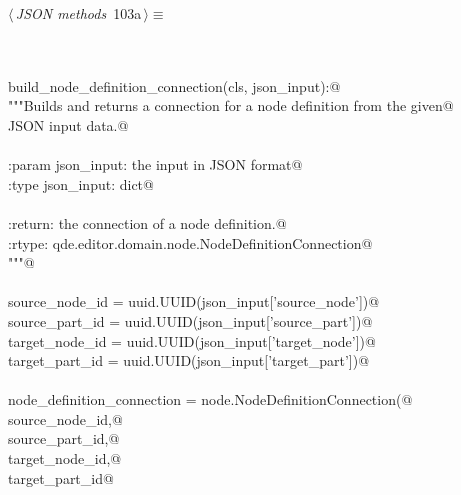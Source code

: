 \documentclass[
    a4paper,      %
    10pt,         %
    openright,    %
    notitlepage,  %
    parskip=half, %
]{scrreprt}       %
\theoremstyle{definition}                    %
\begin{document}
\begin{flushleft} \small
\begin{minipage}{\linewidth}\label{scrap167}\raggedright\small
{} $\langle\,${\itshape JSON methods}\nobreak\ {\footnotesize {103a}}$\,\rangle\equiv$
\vspace{-1exm}
\begin{list}{}{} \item
\mbox{}\lstinline@@\\
\mbox{}\lstinline@classmethod@\\
\mbox{}\lstinline@def build_node_definition_connection(cls, json_input):@\\
\mbox{}\lstinline@    """Builds and returns a connection for a node definition from the given@\\
\mbox{}\lstinline@    JSON input data.@\\
\mbox{}\lstinline@@\\
\mbox{}\lstinline@    :param json_input: the input in JSON format@\\
\mbox{}\lstinline@    :type  json_input: dict@\\
\mbox{}\lstinline@@\\
\mbox{}\lstinline@    :return: the connection of a node definition.@\\
\mbox{}\lstinline@    :rtype:  qde.editor.domain.node.NodeDefinitionConnection@\\
\mbox{}\lstinline@    """@\\
\mbox{}\lstinline@@\\
\mbox{}\lstinline@    source_node_id = uuid.UUID(json_input['source_node'])@\\
\mbox{}\lstinline@    source_part_id = uuid.UUID(json_input['source_part'])@\\
\mbox{}\lstinline@    target_node_id = uuid.UUID(json_input['target_node'])@\\
\mbox{}\lstinline@    target_part_id = uuid.UUID(json_input['target_part'])@\\
\mbox{}\lstinline@@\\
\mbox{}\lstinline@    node_definition_connection = node.NodeDefinitionConnection(@\\
\mbox{}\lstinline@        source_node_id,@\\
\mbox{}\lstinline@        source_part_id,@\\
\mbox{}\lstinline@        target_node_id,@\\
\mbox{}\lstinline@        target_part_id@\\

\end{list}
\end{minipage}
\end{flushleft}
\end{document}
